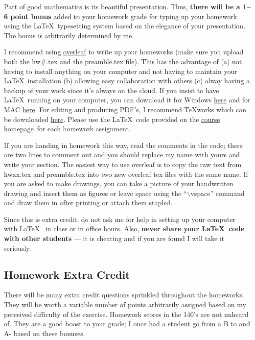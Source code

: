 \documentclass[12pt]{article}
\newcommand{\ingreen}[1]{\color{green}\textbf{#1} \color{black}}
\newcommand{\coursewebpage}{\href{https://github.com/kapelner/QC_Math_341_Spring_2019}{course homepage}}
\newcommand{\qu}[1]{``#1''}
\begin{document}
Part of good mathematics is its beautiful presentation. Thus, \ingreen{there will be a 1--6 point bonus} added to your homework grade  for typing up your homework using the \LaTeX ~typesetting system based on the elegance of your presentation. The bonus is arbitrarily determined by me.

I recommend using \href{http://overleaf.com}{overleaf} to write up your homeworks (make sure you upload both the hw\#.tex and the preamble.tex file). This has the advantage of (a) not having to install anything on your computer and not having to maintain your \LaTeX ~installation (b) allowing easy collaboration with others (c) alway having a backup of your work since it's always on the cloud. If you insist to have \LaTeX ~running on your computer, you can download it for Windows \href{http://www.miktex.org/download}{here} and for MAC \href{http://www.tug.org/mactex/}{here}. For editing and producing PDF's, I recommend \TeX works which can be downloaded \href{http://www.tug.org/texworks/#Getting_TeXworks}{here}. Please use the \LaTeX ~code provided on the \coursewebpage ~for each homework assignment. 

If you are handing in homework this way, read the comments in the code; there are two lines to comment out and you should replace my name with yours and write your section. The easiest way to use overleaf is to copy the raw text from hwxx.tex and preamble.tex into two new overleaf tex files with the same name. If you are asked to make drawings, you can take a picture of your handwritten drawing and insert them as figures or leave space using the \qu{$\backslash$vspace} command and draw them in after printing or attach them stapled.

Since this is extra credit, do not ask me for help in setting up your computer with \LaTeX~ in class or in office hours. Also, \textbf{never share your \LaTeX~code with other students} --- it is cheating and if you are found I will take it seriously.

\subsection*{Homework Extra Credit}

There will be many extra credit questions sprinkled throughout the homeworks. They will be worth a variable number of points arbitrarily assigned based on my perceived difficulty of the exercise. Homework scores in the 140's are not unheard of. They are a good boost to your grade; I once had a student go from a B to and A- based on these bonuses.
%
%
\end{document}
